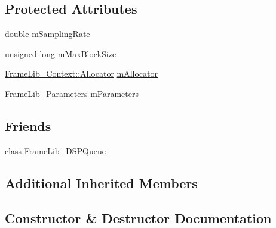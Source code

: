 \subsection*{Protected Attributes}
\begin{DoxyCompactItemize}
\item 
double \hyperlink{class_frame_lib___d_s_p_ad638dccde211f80eedca3d898f2c6ff6}{m\+Sampling\+Rate}
\item 
unsigned long \hyperlink{class_frame_lib___d_s_p_a92c6d7101aee042e778fc8e09d5c8f77}{m\+Max\+Block\+Size}
\item 
\hyperlink{class_frame_lib___context_a4cfa321c8f6048211d031f05156b5b19}{Frame\+Lib\+\_\+\+Context\+::\+Allocator} \hyperlink{class_frame_lib___d_s_p_a4dd06a3e750380c0d89015d1648a0907}{m\+Allocator}
\item 
\hyperlink{class_frame_lib___parameters}{Frame\+Lib\+\_\+\+Parameters} \hyperlink{class_frame_lib___d_s_p_a01fec01b8ecbf2a80b98f989a568105c}{m\+Parameters}
\end{DoxyCompactItemize}
\subsection*{Friends}
\begin{DoxyCompactItemize}
\item 
class \hyperlink{class_frame_lib___d_s_p_a0d8e87d113fd295c3797b6f66442ccf8}{Frame\+Lib\+\_\+\+D\+S\+P\+Queue}
\end{DoxyCompactItemize}
\subsection*{Additional Inherited Members}


\subsection{Constructor \& Destructor Documentation}
\mbox{\label{class_frame_lib___d_s_p_a404abe3f4d147a34a16e9b2077b66dd9}} 
